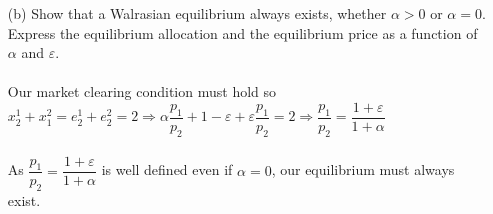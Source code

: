 \documentclass[11pt]{article}
\begin{document}
\begin{enumerate}
\begin{itemize}
	\item[(b)] Show that a Walrasian equilibrium always exists, whether $\alpha>0$ or $\alpha=0$. Express the equilibrium allocation and the equilibrium price as a function of $\alpha$ and $\varepsilon$.
	\smallskip\\\\
	Our market clearing condition must hold so\\
	$x_2^1+x_1^2=e_2^1+e_2^2=2\Rightarrow\alpha\dfrac{p_1}{p_2}+1-\varepsilon+\varepsilon\dfrac{p_1}{p_2}=2\Rightarrow\dfrac{p_1}{p_2}=\dfrac{1+\varepsilon}{1+\alpha}$\\\\
	As $\dfrac{p_1}{p_2}=\dfrac{1+\varepsilon}{1+\alpha}$ is well defined even if $\alpha=0$, our equilibrium must always exist.
	\end{itemize}
\end{enumerate}
\end{document}
